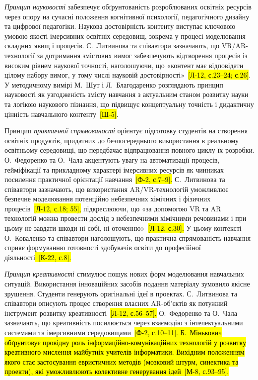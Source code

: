 \emph{Принцип науковості} забезпечує обґрунтованість розроблюваних освітніх ресурсів через опору на сучасні положення когнітивної психології, педагогічного дизайну та цифрової педагогіки. Наукова достовірність контенту виступає ключовою умовою якості імерсивних освітніх середовищ, зокрема у процесі моделювання складних явищ і процесів. С.~Литвинова та співавтори зазначають, що VR/AR-технології за дотримання змістових вимог забезпечують відтворення процесів із високим рівнем наукової точності, наголошуючи, що «контент має відповідати цілому набору вимог, у тому числі науковій достовірності»~\hl{{[}Л-12, с.23--24; с.26{]}}. У методичному вимірі М.~Шут і Л.~Благодаренко розглядають принцип науковості як узгодженість змісту навчання з актуальним станом розвитку науки та логікою наукового пізнання, що підвищує концептуальну точність і дидактичну цінність навчального контенту~\hl{{[}Ш-5{]}}.

Принцип \emph{практичної спрямованості} орієнтує підготовку студентів на створення освітніх продуктів, придатних до безпосереднього використання в реальному освітньому середовищі, що передбачає відпрацювання повного циклу їх розробки. О.~Федоренко та О.~Чала акцентують увагу на автоматизації процесів, гейміфікації та прикладному характері імерсивних ресурсів як чинниках посилення практичної орієнтації навчання~\hl{{[}Ф-2, с.7--9{]}.} С.~Литвинова та співавтори зазначають, що використання AR/VR-технологій уможливлює безпечне моделювання потенційно небезпечних хімічних і фізичних процесів~\hl{{[}Л-12, с.18; 55{]},} підкреслюючи, що «за допомогою VR та AR технологій можна провести дослід з небезпечними хімічними речовинами і при цьому не завдати шкоди ні собі, ні оточенню»~\hl{{[}Л-12, с.30{]}.} У цьому контексті О.~Коваленко та співавтори наголошують, що практична спрямованість навчання сприяє формуванню готовності здобувачів освіти до професійної діяльності\hl{~{[}К-22, с.8{]}.}

\emph{Принцип креативності} стимулює пошук нових форм моделювання навчальних ситуацій. Використання інноваційних засобів подання матеріалу зумовило якісне зрушення. Студенти генерують оригінальні ідеї в проектах. С.~Литвинова та співавтори описують процес створення власних AR-об'єктів як потужний інструмент розвитку креативності~\hl{{[}Л-12, с.56--57{]}.} О.~Федоренко та О.~Чала зазначають, що креативність посилюється через взаємодію з інтелектуальними системами та імерсивними середовищами~\hl{{[}Ф-2, с.10--11{]}. Б.~Мінькович обґрунтовує провідну роль інформаційно-комунікаційних технологій у розвитку креативного мислення майбутніх учителів інформатики. Вихідним положенням якого стає застосування евристичних методів (мозковий штурм, синектика та проекти), які уможливлюють колективне генерування ідей~{[}М-8, с.93--95{]}.}

